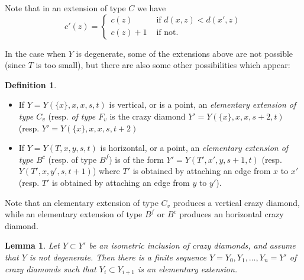 \documentclass[a4paper, 11pt]{article}
\theoremstyle{plain}
\newtheorem{lemma}[proposition]{Lemma}
\theoremstyle{definition}
\newtheorem{definition}[proposition]{Definition}
\theoremstyle{remark}
\begin{document}
Note that in an extension of type $C$ we have $$c'(z)=\begin{cases}
 c(z) &\textrm{ if } d(x,z)<d(x',z)\\
 c(z)+1 &\textrm{ if not}.
 \end{cases}
$$

In the case when $Y$ is degenerate, some of the extensions above are not possible (since $T$ is too small), but there are also some other possibilities which appear:

\begin{definition}
\begin{itemize}
    \item If $Y=Y(\{x\},x,x,s,t)$ is vertical, or is a point, an \emph{elementary extension of type $C_v$} (resp. \emph{of type $F_v$} is the crazy diamond $Y'=Y(\{x\},x,x,s+2,t)$ (resp. $Y'=Y(\{x\},x,x,s,t+2)$
    \item If $Y=Y(T,x,y,s,t)$ is horizontal, or a point, an \emph{elementary extension of type $B^c$} (resp. of type $B^f$) is of the form $Y'=Y(T',x',y,s+1,t)$ (resp. $Y(T',x,y',s,t+1)$) where $T'$ is obtained by attaching an edge from $x$ to $x'$ (resp. $T'$ is obtained by attaching an edge from $y$ to $y'$).
\end{itemize}
\end{definition}

Note that an elementary extension of type $C_v$ produces a vertical crazy diamond, while an elementary extension of type $B^f$ or $B^c$ produces an horizontal crazy diamond.

\begin{lemma}\label{lem:seqextensions}
Let $Y\subset Y'$ be an isometric inclusion of crazy diamonds, and assume that $Y$ is not degenerate. Then there is a finite sequence $Y=Y_0,Y_1,\dots,Y_n=Y'$ of crazy diamonds such that $Y_i\subset Y_{i+1}$ is an elementary extension. %
\end{lemma}
\end{document}
